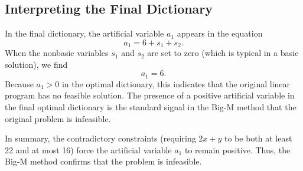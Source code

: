 \subsection*{Interpreting the Final Dictionary}

In the final dictionary, the artificial variable \(a_1\) appears in the equation
\[
a_1 = 6 + s_1 + s_2.
\]
When the nonbasic variables \(s_1\) and \(s_2\) are set to zero (which is typical in a basic solution), we find
\[
a_1 = 6.
\]
Because \(a_1 > 0\) in the optimal dictionary, this indicates that the original linear program has no feasible solution. The presence of a positive artificial variable in the final optimal dictionary is the standard signal in the Big‑M method that the original problem is infeasible.

\bigskip

\noindent In summary, the contradictory constraints (requiring \(2x+y\) to be both at least 22 and at most 16) force the artificial variable \(a_1\) to remain positive. Thus, the Big‑M method confirms that the problem is infeasible.

